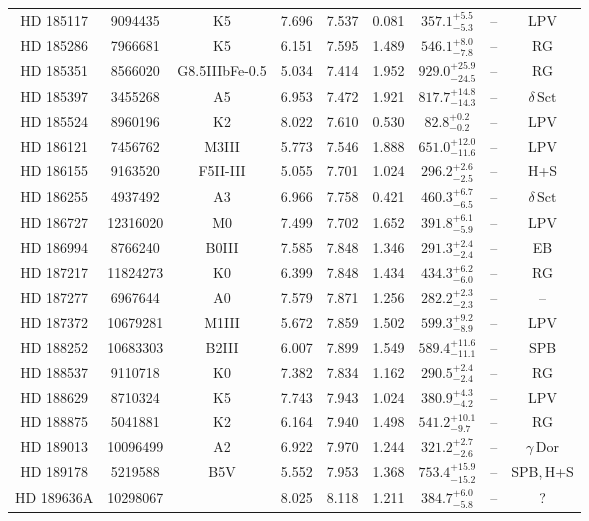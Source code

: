 \begin{table*}
\begin{tabular}{ccccccccc}
HD 185117 & 9094435 & K5 & 7.696 & 7.537 & 0.081 & $357.1^{+5.5}_{-5.3}$ & -- & LPV \\
HD 185286 & 7966681 & K5 & 6.151 & 7.595 & 1.489 & $546.1^{+8.0}_{-7.8}$ & -- & RG \\
HD 185351 & 8566020 & G8.5IIIbFe-0.5 & 5.034 & 7.414 & 1.952 & $929.0^{+25.9}_{-24.5}$ & -- & RG \\
HD 185397 & 3455268 & A5 & 6.953 & 7.472 & 1.921 & $817.7^{+14.8}_{-14.3}$ & -- & $\delta\,\text{Sct}$ \\
HD 185524 & 8960196 & K2 & 8.022 & 7.610 & 0.530 & $82.8^{+0.2}_{-0.2}$ & -- & LPV \\
HD 186121 & 7456762 & M3III & 5.773 & 7.546 & 1.888 & $651.0^{+12.0}_{-11.6}$ & -- & LPV \\
HD 186155 & 9163520 & F5II-III & 5.055 & 7.701 & 1.024 & $296.2^{+2.6}_{-2.5}$ & -- & H+S \\
HD 186255 & 4937492 & A3 & 6.966 & 7.758 & 0.421 & $460.3^{+6.7}_{-6.5}$ & -- & $\delta\,\text{Sct}$ \\
HD 186727 & 12316020 & M0 & 7.499 & 7.702 & 1.652 & $391.8^{+6.1}_{-5.9}$ & -- & LPV \\
HD 186994 & 8766240 & B0III & 7.585 & 7.848 & 1.346 & $291.3^{+2.4}_{-2.4}$ & -- & EB \\
HD 187217 & 11824273 & K0 & 6.399 & 7.848 & 1.434 & $434.3^{+6.2}_{-6.0}$ & -- & RG \\
HD 187277 & 6967644 & A0 & 7.579 & 7.871 & 1.256 & $282.2^{+2.3}_{-2.3}$ & -- & -- \\
HD 187372 & 10679281 & M1III & 5.672 & 7.859 & 1.502 & $599.3^{+9.2}_{-8.9}$ & -- & LPV \\
HD 188252 & 10683303 & B2III & 6.007 & 7.899 & 1.549 & $589.4^{+11.6}_{-11.1}$ & -- & SPB \\
HD 188537 & 9110718 & K0 & 7.382 & 7.834 & 1.162 & $290.5^{+2.4}_{-2.4}$ & -- & RG \\
HD 188629 & 8710324 & K5 & 7.743 & 7.943 & 1.024 & $380.9^{+4.3}_{-4.2}$ & -- & LPV \\
HD 188875 & 5041881 & K2 & 6.164 & 7.940 & 1.498 & $541.2^{+10.1}_{-9.7}$ & -- & RG \\
HD 189013 & 10096499 & A2 & 6.922 & 7.970 & 1.244 & $321.2^{+2.7}_{-2.6}$ & -- & $\gamma\,\text{Dor}$ \\
HD 189178 & 5219588 & B5V & 5.552 & 7.953 & 1.368 & $753.4^{+15.9}_{-15.2}$ & -- & SPB,\,H+S \\
HD 189636A & 10298067 &  & 8.025 & 8.118 & 1.211 & $384.7^{+6.0}_{-5.8}$ & -- & ? \\

\end{tabular}
\end{table*}
